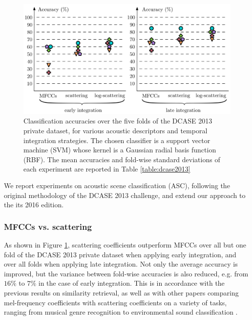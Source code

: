 \documentclass[journal]{IEEEtran}
\makeatletter
\newcommand*{\eg}{e.g.\@\xspace}
\newcommand*{\vs}{vs.\@\xspace}
\makeatother
\begin{document}
\begin{figure}
\begin{center}
\includegraphics[width=\columnwidth]{folds.png}
\caption{Classification accuracies over the five folds of the DCASE 2013 private dataset, for various acoustic descriptors and temporal integration strategies. 
The chosen classifier is a support vector machine (SVM) whose kernel is a Gaussian radial basis function (RBF).
The mean accuracies and fold-wise standard deviations of each experiment are reported in Table \ref{table:dcase2013}}
\end{center}
\label{fig:folds}
\end{figure}


We report experiments on acoustic scene classification (ASC), following the original methodology of the DCASE 2013 challenge, and extend our approach to the its 2016 edition.

\subsubsection*{MFCCs \vs scattering}

As shown in Figure \ref{fig:folds}, scattering coefficients outperform MFCCs over all but one fold of the DCASE 2013 private dataset when applying early integration, and over all folds when applying late integration.
Not only the average accuracy is improved, but the variance between fold-wise accuracies is also reduced, \eg from $16\%$ to $7\%$ in the case of early integration.
This is in accordance with the previous results on similarity retrieval, as well as with other papers comparing mel-frequency coefficients with scattering coefficients on a variety of tasks, ranging from musical genre recognition \cite{Anden2014} to environmental sound classification \cite{Salamon2015}.
\end{document}
